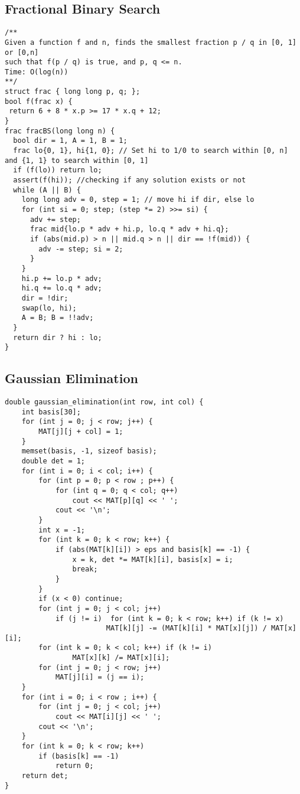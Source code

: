 \documentclass[FSZ,a4paper,onesided]{article}
\begin{document}
\begin{multicols*}{\COLS}
\subsection{Fractional Binary Search}
\begin{lstlisting}
/**
Given a function f and n, finds the smallest fraction p / q in [0, 1] or [0,n]
such that f(p / q) is true, and p, q <= n.
Time: O(log(n))
**/
struct frac { long long p, q; };
bool f(frac x) {
 return 6 + 8 * x.p >= 17 * x.q + 12;
}
frac fracBS(long long n) {
  bool dir = 1, A = 1, B = 1;
  frac lo{0, 1}, hi{1, 0}; // Set hi to 1/0 to search within [0, n] and {1, 1} to search within [0, 1]
  if (f(lo)) return lo;
  assert(f(hi)); //checking if any solution exists or not
  while (A || B) {
    long long adv = 0, step = 1; // move hi if dir, else lo
    for (int si = 0; step; (step *= 2) >>= si) {
      adv += step;
      frac mid{lo.p * adv + hi.p, lo.q * adv + hi.q};
      if (abs(mid.p) > n || mid.q > n || dir == !f(mid)) {
        adv -= step; si = 2;
      } 
    }
    hi.p += lo.p * adv;
    hi.q += lo.q * adv;
    dir = !dir;
    swap(lo, hi);
    A = B; B = !!adv;
  }
  return dir ? hi : lo;
}
\end{lstlisting}
\subsection{Gaussian Elimination}
\begin{lstlisting}
double gaussian_elimination(int row, int col) {
    int basis[30];
    for (int j = 0; j < row; j++) {
        MAT[j][j + col] = 1;
    }
    memset(basis, -1, sizeof basis);
    double det = 1;
    for (int i = 0; i < col; i++) {
        for (int p = 0; p < row ; p++) {
            for (int q = 0; q < col; q++)
                cout << MAT[p][q] << ' ';
            cout << '\n';
        }
        int x = -1;
        for (int k = 0; k < row; k++) {
            if (abs(MAT[k][i]) > eps and basis[k] == -1) {
                x = k, det *= MAT[k][i], basis[x] = i;
                break;
            }
        }
        if (x < 0) continue;
        for (int j = 0; j < col; j++)
            if (j != i)  for (int k = 0; k < row; k++) if (k != x)
                        MAT[k][j] -= (MAT[k][i] * MAT[x][j]) / MAT[x][i];
        for (int k = 0; k < col; k++) if (k != i)
                MAT[x][k] /= MAT[x][i];
        for (int j = 0; j < row; j++)
            MAT[j][i] = (j == i);
    }
    for (int i = 0; i < row ; i++) {
        for (int j = 0; j < col; j++)
            cout << MAT[i][j] << ' ';
        cout << '\n';
    }
    for (int k = 0; k < row; k++)
        if (basis[k] == -1)
            return 0;
    return det;
}\end{lstlisting}

\end{multicols*}
\end{document}
